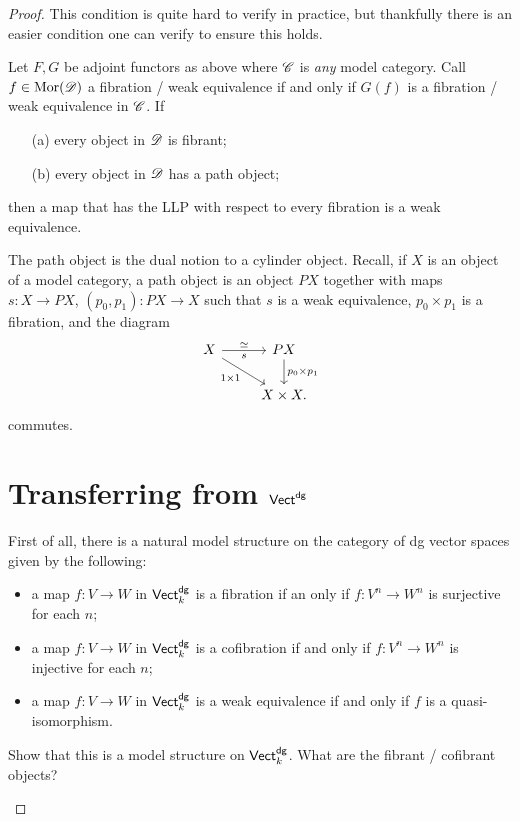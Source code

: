 \documentclass[11pt]{amsart}
\begin{document}
\begin{proof}
This condition is quite hard to verify in practice, but thankfully there is an easier condition one can verify to ensure this holds. 

\begin{prop}\label{prop: easy}
Let $F,G$ be adjoint functors as above where $\mathscr C$ is {\em any} model category. 
Call $f \in {\rm Mor}(\mathscr D)$ a fibration / weak equivalence if and only if $G(f)$ is a fibration / weak equivalence in $\mathscr C$. 
If
\begin{itemize}
\item[(a)] every object in $\mathscr D$ is fibrant;
\item[(b)] every object in $\mathscr D$ has a path object;
\end{itemize}
then a map that has the LLP with respect to every fibration is a weak equivalence.
\end{prop}

\begin{rmk}
The path object is the dual notion to a cylinder object.
Recall, if $X$ is an object of a model category, a path object is an object $PX$ together with maps $s : X \to PX$, $(p_0,p_1) : PX \to X$ such that $s$ is a weak equivalence, $p_0 \times p_1$ is a fibration, and the diagram
\[
\begin{tikzcd}
X \ar[r,"s"', "\simeq"]  \ar[dr, "1 \times 1"'] & P X \ar[d, "p_0 \times p_1"] \\
& X \times X .
\end{tikzcd}
\]
commutes.
\end{rmk}

\section{Transferring from ${\sf Vect}^{\sf dg}$}

First of all, there is a natural model structure on the category of dg vector spaces given by the following:
\begin{itemize}
\item a map $f : V \to W$ in ${\sf Vect}^{\sf dg}_k$ is a fibration if an only if $f : V^n \to W^n$ is surjective for each $n$;
\item a map $f : V \to W$ in ${\sf Vect}^{\sf dg}_k$ is a cofibration if and only if $f : V^n \to W^n$ is injective for each $n$;
\item a map $f : V \to W$ in ${\sf Vect}^{\sf dg}_k$ is a weak equivalence if and only if $f$ is a quasi-isomorphism. 
\end{itemize}

\begin{ex}
Show that this is a model structure on ${\sf Vect}^{\sf dg}_k$.
What are the fibrant / cofibrant objects?
\end{ex}


\end{proof}
\end{document}

